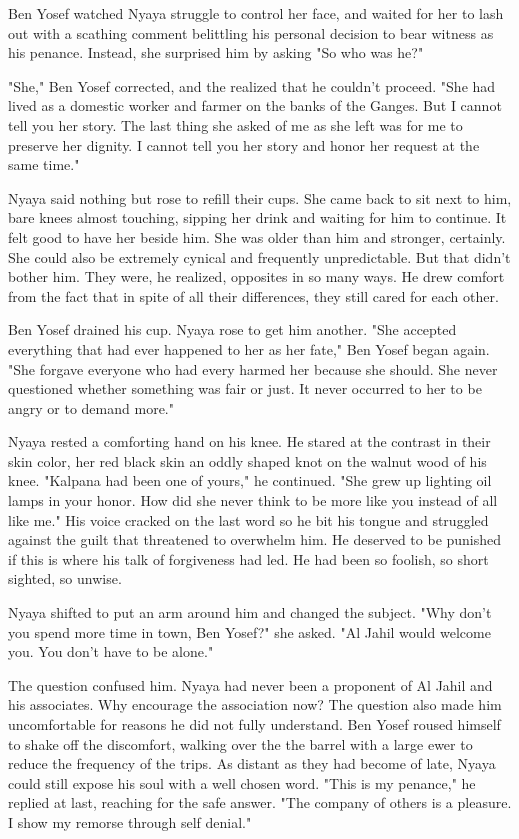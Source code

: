 \documentclass{amsart}
\begin{document}
Ben Yosef watched Nyaya struggle to control her face, and waited for her to lash out with a scathing comment belittling his personal decision to bear witness as his penance. Instead, she surprised him by asking "So who was he?"

"She," Ben Yosef corrected, and the realized that he couldn't proceed. "She had lived as a domestic worker and farmer on the banks of the Ganges. But I cannot tell you her story. The last thing she asked of me as she left was for me to preserve her dignity. I cannot tell you her story and honor her request at the same time." 

Nyaya said nothing but rose to refill their cups. She came back to sit next to him, bare knees almost touching, sipping her drink and waiting for him to continue. It felt good to have her beside him. She was older than him and stronger, certainly. She could also be extremely cynical and frequently unpredictable. But that didn't bother him. They were, he realized, opposites in so many ways. He drew comfort from the fact that in spite of all their differences, they still cared for each other. 

Ben Yosef drained his cup. Nyaya rose to get him another. "She accepted everything that had ever happened to her as her fate," Ben Yosef began again. "She forgave everyone who had every harmed her because she should. She never questioned whether something was fair or just. It never occurred to her to be angry or to demand more."

Nyaya rested a comforting hand on his knee. He stared at the contrast in their skin color, her red black skin an oddly shaped knot on the walnut wood of his knee. "Kalpana had been one of yours," he continued. "She grew up lighting oil lamps in your honor. How did she never think to be more like you instead of all like me." His voice cracked on the last word so he bit his tongue and struggled against the guilt that threatened to overwhelm him. He deserved to be punished if this is where his talk of forgiveness had led. He had been so foolish, so short sighted, so unwise. 

Nyaya shifted to put an arm around him and changed the subject. "Why don't you spend more time in town, Ben Yosef?" she asked. "Al Jahil would welcome you. You don't have to be alone."

The question confused him. Nyaya had never been a proponent of Al Jahil and his associates. Why encourage the association now? The question also made him uncomfortable for reasons he did not fully understand. Ben Yosef roused himself to shake off the discomfort, walking over the the barrel with a large ewer to reduce the frequency of the trips. As distant as they had become of late, Nyaya could still expose his soul with a well chosen word. "This is my penance," he replied at last, reaching for the safe answer. "The company of others is a pleasure. I show my remorse through self denial." 
\end{document}
